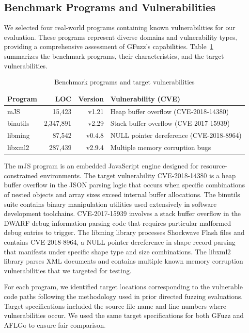 \documentclass[review]{elsarticle}
\begin{document}
\subsection{Benchmark Programs and Vulnerabilities}

We selected four real-world programs containing known vulnerabilities for our evaluation. These programs represent diverse domains and vulnerability types, providing a comprehensive assessment of GFuzz's capabilities. Table~\ref{tab:benchmarks} summarizes the benchmark programs, their characteristics, and the target vulnerabilities.

\begin{table}[!htbp]
\centering
\caption{Benchmark programs and target vulnerabilities}
\label{tab:benchmarks}
\begin{tabular}{lrrl}
\toprule
\textbf{Program} & \textbf{LOC} & \textbf{Version} & \textbf{Vulnerability (CVE)} \\
\midrule
mJS & 15,423 & v1.21 & Heap buffer overflow (CVE-2018-14380) \\
binutils & 2,347,891 & v2.29 & Stack buffer overflow (CVE-2017-15939) \\
libming & 87,542 & v0.4.8 & NULL pointer dereference (CVE-2018-8964) \\
libxml2 & 287,439 & v2.9.4 & Multiple memory corruption bugs \\
\bottomrule
\end{tabular}
\end{table}

The mJS program is an embedded JavaScript engine designed for resource-constrained environments. The target vulnerability CVE-2018-14380 is a heap buffer overflow in the JSON parsing logic that occurs when specific combinations of nested objects and array sizes exceed internal buffer allocations. The binutils suite contains binary manipulation utilities used extensively in software development toolchains. CVE-2017-15939 involves a stack buffer overflow in the DWARF debug information parsing code that requires particular malformed debug entries to trigger. The libming library processes Shockwave Flash files and contains CVE-2018-8964, a NULL pointer dereference in shape record parsing that manifests under specific shape type and size combinations. The libxml2 library parses XML documents and contains multiple known memory corruption vulnerabilities that we targeted for testing.

For each program, we identified target locations corresponding to the vulnerable code paths following the methodology used in prior directed fuzzing evaluations. Target specifications included the source file name and line numbers where vulnerabilities occur. We used the same target specifications for both GFuzz and AFLGo to ensure fair comparison.
\end{document}
